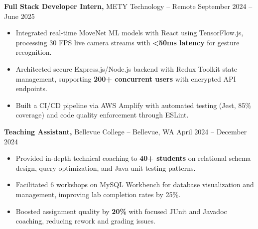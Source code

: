 \documentclass[11pt]{article}       %
\begin{document}
\textbf{Full Stack Developer Intern,} {METY Technology} -- Remote \hfill September 2024 -- June 2025
\vspace{-9pt}
\begin{itemize}
  \item Integrated real-time MoveNet ML models with React using TensorFlow.js, processing 30 FPS live camera streams with \textbf{<50ms latency} for gesture recognition.
  \item Architected secure Express.js/Node.js backend with Redux Toolkit state management, supporting \textbf{200+ concurrent users} with encrypted API endpoints.
  \item Built a CI/CD pipeline via AWS Amplify with automated testing (Jest, 85\% coverage) and code quality enforcement through ESLint.
\end{itemize}

\textbf{Teaching Assistant,} {Bellevue College} -- Bellevue, WA \hfill April 2024 -- December 2024 \\
\vspace{-9pt}
\begin{itemize}
  \item Provided in-depth technical coaching to \textbf{40+ students} on relational schema design, query optimization, and Java unit testing patterns.
  \item Facilitated 6 workshops on MySQL Workbench for database visualization and management, improving lab completion rates by 25\%.
  \item Boosted assignment quality by \textbf{20\%} with focused JUnit and Javadoc coaching, reducing rework and grading issues.
\end{itemize}
\end{document}
